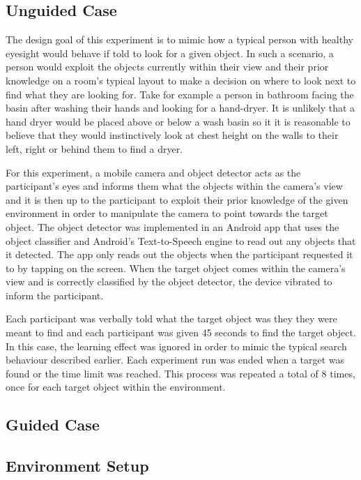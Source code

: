 \documentclass[runningheads]{llncs}
\begin{document}
\subsection{Unguided Case}

The design goal of this experiment is to mimic how a typical person with healthy eyesight would behave if told to look for a given object. 
In such a scenario, a person would exploit the objects currently within their view and their prior knowledge on a room's typical layout to make a decision on where to look next to find what they are looking for. 
Take for example a person in bathroom facing the basin after washing their hands and looking for a hand-dryer. 
It is unlikely that a hand dryer would be placed above or below a wash basin so it it is reasonable to believe that they would instinctively look at chest height on the walls to their left, right or behind them to find a dryer. 

For this experiment, a mobile camera and object detector acts as the participant's eyes and informs them what the objects within the camera's view and it is then up to the participant to exploit their prior knowledge of the given environment in order to manipulate the camera to point towards the target object. 
The object detector was implemented in an Android app that uses the object classifier and Android's Text-to-Speech engine to read out any objects that it detected. 
The app only reads out the objects when the participant requested it to by tapping on the screen. 
When the target object comes within the camera's view and is correctly classified by the object detector, the device vibrated to inform the participant. 

Each participant was verbally told what the target object was they they were meant to find and each participant was given 45 seconds to find the target object. 
In this case, the learning effect was ignored in order to mimic the typical search behaviour described earlier. 
Each experiment run was ended when a target was found or the time limit was reached. 
This process was repeated a total of 8 times, once for each target object within the environment. 

\subsection{Guided Case}

\subsection{Environment Setup}
\end{document}
